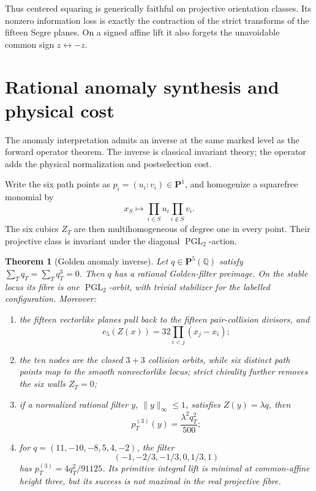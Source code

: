 \documentclass[11pt]{article}
\newtheorem{theorem}{Theorem}[section]
\theoremstyle{definition}
\theoremstyle{remark}
\begin{document}
Thus centered squaring is generically faithful on projective orientation
classes.  Its nonzero information loss is exactly the contraction of the
strict transforms of the fifteen Segre planes.  On a signed affine lift it
also forgets the unavoidable common sign \(z\leftrightarrow-z\).

\section{Rational anomaly synthesis and physical cost}

The anomaly interpretation admits an inverse at the same marked level as
the forward operator theorem.  The inverse is classical invariant theory;
the operator adds the physical normalization and postselection cost.

Write the six path points as \(p_i=(u_i:v_i)\in\mathbf P^1\), and
homogenize a squarefree monomial by
\[
 x_S\longmapsto
 \prod_{i\in S}u_i\prod_{i\notin S}v_i.
\]
The six cubics \(Z_T\) are then multihomogeneous of degree one in every
point.  Their projective class is invariant under the diagonal
\(\operatorname{PGL}_2\)-action.

\begin{theorem}[Golden anomaly inverse]
\label{thm:anomaly-inverse}
Let \(q\in\mathbf P^5(\mathbb Q)\) satisfy
\(\sum_Tq_T=\sum_Tq_T^3=0\).
Then \(q\) has a rational Golden-filter preimage.  On the stable locus its
fibre is one \(\operatorname{PGL}_2\)-orbit, with trivial stabilizer for the
labelled configuration.  Moreover:
\begin{enumerate}[label=\textup{(\roman*)},leftmargin=*]
\item the fifteen vectorlike planes pull back to the fifteen pair-collision
  divisors, and
  \[
    e_5(Z(x))=32\prod_{i<j}(x_j-x_i);
  \]
\item the ten nodes are the closed \(3+3\) collision orbits, while six
  distinct path points map to the smooth nonvectorlike locus; strict
  chirality further removes the six walls \(Z_T=0\);
\item if a normalized rational filter \(y\),
  \(\lVert y\rVert_\infty\leq1\), satisfies \(Z(y)=\lambda q\), then
  \[
    p_T^{(3)}(y)=\frac{\lambda^2q_T^2}{500};
  \]
\item for \(q=(11,-10,-8,5,4,-2)\), the filter
  \[
    (-1,-2/3,-1/3,0,1/3,1)
  \]
  has
  \(p_T^{(3)}=4q_T^2/91125\).  Its primitive integral lift is minimal at
  common-affine height three, but its success is not maximal in the real
  projective fibre.
\end{enumerate}
\end{theorem}
\end{document}
